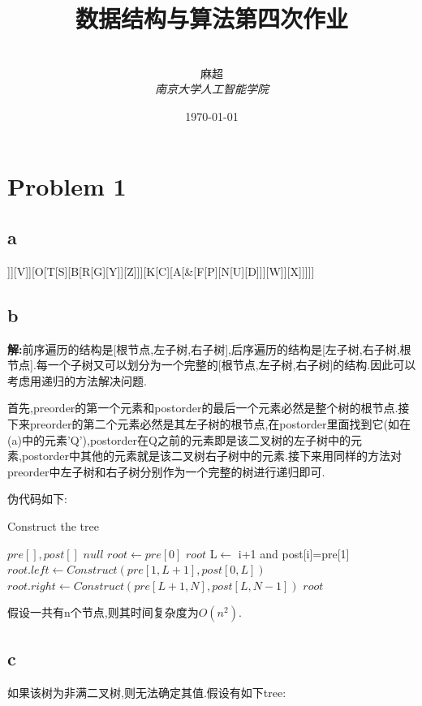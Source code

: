 \documentclass[12pt,a4paper,fontset=none]{ctexart}
\title{\textbf{数据结构与算法第四次作业}}
\author{
\\
\Large{麻超 \quad 201300066}
\\[6pt]
{ \large \textit{南京大学人工智能学院}}\\[2pt]
}
\date{\today}
\begin{document}
\maketitle
\setcounter{page}{1}
\section*{Problem 1}
\subsection*{a}
\begin{center}
	\begin{forest}
		[I[Q[J[H][L[E][M]]][V]][O[T[S][B[R[G][Y]][Z]]][K[C][A[\&[F[P][N[U][D]]][W]][X]]]]]
	\end{forest}
\end{center}
\subsection*{b}
\textbf{解:}前序遍历的结构是[根节点,左子树,右子树],后序遍历的结构是[左子树,右子树,根节点].每一个子树又可以划分为一个完整的[根节点,左子树,右子树]的结构.因此可以考虑用递归的方法解决问题.

首先,preorder的第一个元素和postorder的最后一个元素必然是整个树的根节点.接下来preorder的第二个元素必然是其左子树的根节点,在postorder里面找到它(如在(a)中的元素'Q'),postorder在Q之前的元素即是该二叉树的左子树中的元素,postorder中其他的元素就是该二叉树右子树中的元素.接下来用同样的方法对preorder中左子树和右子树分别作为一个完整的树进行递归即可.

伪代码如下:
\begin{algorithm}
	\renewcommand{\algorithmicensure}{\textbf{Output:}}
	\renewcommand{\algorithmicrequire}{\textbf{Input:}}
	\caption{Construct the tree}
	\label{alg1}
	\begin{algorithmic}
		\Require $pre[],post[]$
		\Return $null$
		\EndIf
		\State $root\gets pre[0]$
		\Return $root$
		\EndIf
		\State L$\gets$ i+1 and post[i]=pre[1]
		\State $root.left\gets Construct(pre[1,L+1],post[0,L])$
		\State $root.right\gets Construct(pre[L+1,N],post[L,N-1])$
		\Return $root$
		\EndFunction
	\end{algorithmic}
\end{algorithm}
假设一共有n个节点,则其时间复杂度为$O(n^2)$.
\subsection*{c}
如果该树为非满二叉树,则无法确定其值.假设有如下tree:
\end{document}
